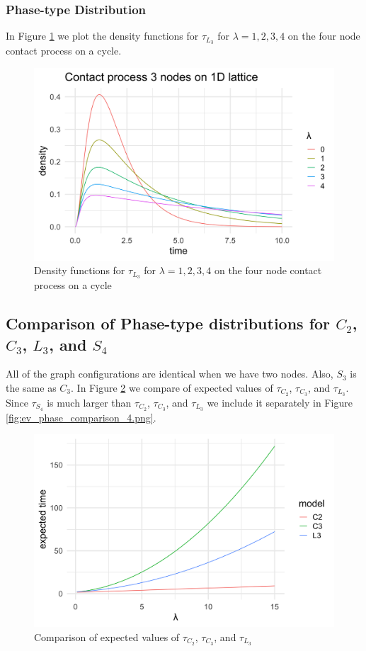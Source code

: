 \subsubsection{Phase-type Distribution}

In Figure \ref{fig:lattice_3_contact_phase_densities} we plot the density functions for $\tau_{L_3}$ for $\lambda = 1, 2, 3, 4$ on the four node contact process on a cycle.

\begin{figure}[H]
  \centering
    \includegraphics[width=.80\textwidth]{figures/lattice_3_contact_phase_densities.png}
   \caption{Density functions for $\tau_{L_3}$ for $\lambda = 1, 2, 3, 4$ on the four node contact process on a cycle}
  \label{fig:lattice_3_contact_phase_densities}
\end{figure}

\subsection{Comparison of Phase-type distributions for \texorpdfstring{$C_2$}{C2}, \texorpdfstring{$C_3$}{C3}, \texorpdfstring{$L_3$}{L3}, and \texorpdfstring{$S_4$}{S4}}

All of the graph configurations are identical when we have two nodes.
Also, $S_3$ is the same as $C_3$.
In Figure \ref{fig:ev_phase_comparison_3.png} we compare of expected values of $\tau_{C_2}$, $\tau_{C_3}$, and $\tau_{L_3}$.
Since $\tau_{S_4}$ is much larger than $\tau_{C_2}$, $\tau_{C_3}$, and $\tau_{L_3}$ we include it separately in Figure \ref{fig:ev_phase_comparison_4.png}.

\begin{figure}[H]
  \centering
    \includegraphics[width=.80\textwidth]{figures/ev_phase_comparison_3.png}
   \caption{Comparison of expected values of $\tau_{C_2}$, $\tau_{C_3}$, and $\tau_{L_3}$}
  \label{fig:ev_phase_comparison_3.png}
\end{figure}

